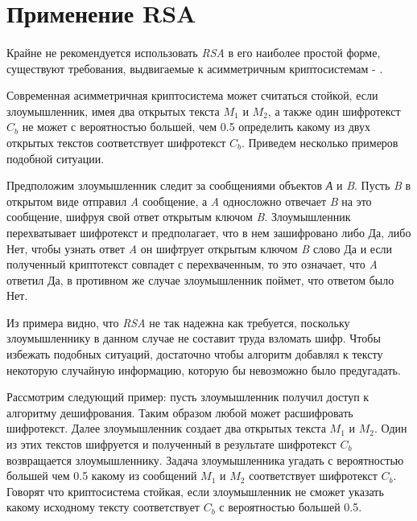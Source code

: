 
\section{Применение RSA}

\paragraph{} Крайне не рекомендуется использовать \textit{RSA} в его наиболее простой форме, существуют требования, выдвигаемые к асимметричным криптосистемам
- \cite[страницы 329-331]{may10}.

  Современная асимметричная криптосистема может считаться стойкой, если злоумышленник, имея два открытых текста {$M_1$} и 
  {$M_2$}, а также один шифротекст {$C_b$} не может с вероятностью большей, чем 0.5 определить какому из двух 
  открытых текстов соответствует шифротекст {$C_b$}. Приведем несколько примеров подобной ситуации.

  Предположим злоумышленник следит за сообщениями объектов \textit{А} и \textit{B}. Пусть 
  \textit{B} в открытом виде отправил \textit{A} сообщение, а \textit{A} односложно отвечает \textit{B} на это сообщение, шифруя свой ответ открытым ключом
  \textit{B}. Злоумышленник перехватывает шифротекст и предполагает, что в нем зашифровано либо Да, либо Нет, чтобы узнать ответ \textit{A} он шифтрует открытым ключом \textit{B} слово Да и если полученный криптотекст совпадет 
  с перехваченным, то это означает, что \textit{A} ответил Да, в противном же случае злоумышленник поймет, что ответом было Нет.

  Из примера видно, что \textit{RSA} не так надежна как требуется, поскольку злоумышленнику в данном случае не составит труда взломать шифр. Чтобы избежать подобных ситуаций, достаточно чтобы алгоритм добавлял к тексту некоторую случайную информацию, которую бы невозможно было предугадать. 

  Рассмотрим следующий пример: пусть злоумышленник получил доступ к алгоритму дешифрования. Таким образом любой может расшифровать шифротекст. Далее злоумышленник создает два открытых текста {$M_1$} и {$M_2$}. 
  Один из этих текстов шифруется и полученный в результате шифротекст {$C_b$} возвращается злоумышленнику. Задача злоумышленника 
  угадать с вероятностью большей чем 0.5 какому из сообщений {$M_1$} и {$M_2$} соответствует шифротекст {$C_b$}. Говорят что криптосистема стойкая, если злоумышленник не сможет указать какому исходному тексту соответствует {$C_b$} с вероятностью большей 0.5.

